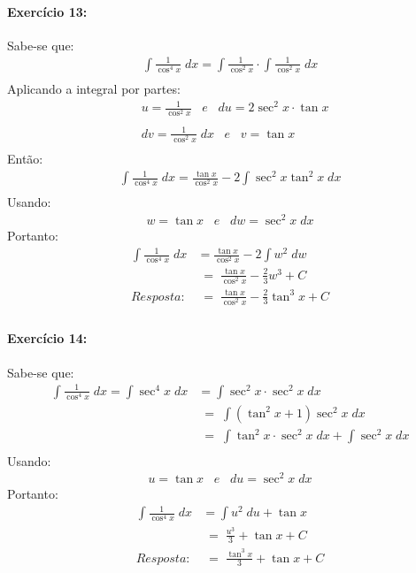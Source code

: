 \documentclass[12pt]{article}
\begin{document}
\paragraph{Exercício 13:}
Sabe-se que:
\begin{align*}
\int \frac{1}{\cos ^{4}x}\;dx = \int \frac{1}{\cos ^{2}x}\cdot \int \frac{1}{\cos ^{2}x}\;dx\\
\end{align*}
Aplicando a integral por partes:
\begin{align*}
&u =\frac{1}{\cos^{2} x} \;\;\;e\;\;\; du = 2\sec^{2} x \cdot \tan x\\ \\
&dv = \frac{1}{\cos ^{2}x}\;dx \;\;\;e\;\;\; v=\tan x\\
\end{align*}
Então:
\begin{align*}
\int \frac{1}{\cos^{4}x}\;dx = \frac{\tan x}{\cos^{2}x}-2\int\sec^{2}x\tan^{2}x\;dx\\
\end{align*}
Usando:
\begin{align*}
w = \tan x \;\;\;e\;\;\; dw = \sec^{2}x\;dx
\end{align*}
Portanto:
\begin{align*}
\int \frac{1}{\cos^{4}x}\;dx &= \frac{\tan x}{\cos^{2}x}-2\int w^{2}\;dw\\
&\;=\; \frac{\tan x}{\cos^{2}x}-\frac{2}{3}w^{3}+C\\
Resposta: &\;=\;\frac{\tan x}{\cos^{2}x}-\frac{2}{3}\tan^{3}x+C\\
\end{align*}


\paragraph{Exercício 14:}
Sabe-se que:
\begin{align*}
\int \frac{1}{\cos^{4}x}\;dx = \int \sec^{4}x\;dx &= \int\sec^{2}x\cdot\sec^{2}x\;dx\\
&\;=\;\int\left ( \tan^{2}x+1 \right )\sec^{2}x\;dx\\
&\;=\;\int\tan^{2}x\cdot\sec^{2}x\;dx+\int\sec^{2}x\;dx\\
\end{align*}
Usando:
\begin{align*}
u = \tan x \;\;\;e\;\;\; du = \sec^{2}x\;dx
\end{align*}
Portanto:
\begin{align*}
\int\frac{1}{\cos^{4}x}\;dx &= \int u^{2}\;du + \tan x\\
&\;=\;\frac{u^{3}}{3}+\tan x + C\\
Resposta: &\;=\;\frac{\tan ^{3}x}{3}+\tan x + C\\
\end{align*}
\end{document}
